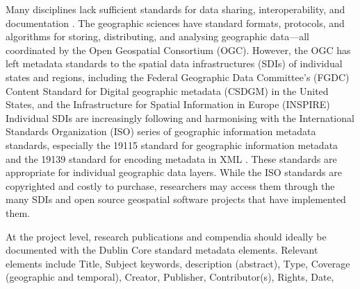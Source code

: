 \documentclass{isprs} %
\begin{document}
Many disciplines lack sufficient standards for data sharing, interoperability, and documentation \citep{NASEM2019}.
The geographic sciences have standard formats, protocols, and algorithms for storing, distributing, and analysing geographic data---all coordinated by the Open Geospatial Consortium (OGC).
However, the OGC has left metadata standards to the spatial data infrastructures (SDIs) of individual states and regions, including the Federal Geographic Data Committee's (FGDC) Content Standard for Digital geographic metadata (CSDGM) in the United States, and the Infrastructure for Spatial Information in Europe (INSPIRE) \cite{Kim1999,Bartha2011}
Individual SDIs are increasingly following and harmonising with the International Standards Organization (ISO) series of geographic information metadata standards, especially the 19115 standard for geographic information metadata \citep{ISO2014} and the 19139 standard for encoding metadata in XML \citep{ISO2019}.
These standards are appropriate for individual geographic data layers.
While the ISO standards are copyrighted and costly to purchase, researchers may access them through the many SDIs and open source geospatial software projects that have implemented them.

At the project level, research publications and compendia should ideally be documented with the Dublin Core\texttrademark{}  standard metadata elements. Relevant elements include Title, Subject keywords, description (abstract), Type, Coverage (geographic and temporal), Creator, Publisher, Contributor(s), Rights, Date, 
\end{document}
